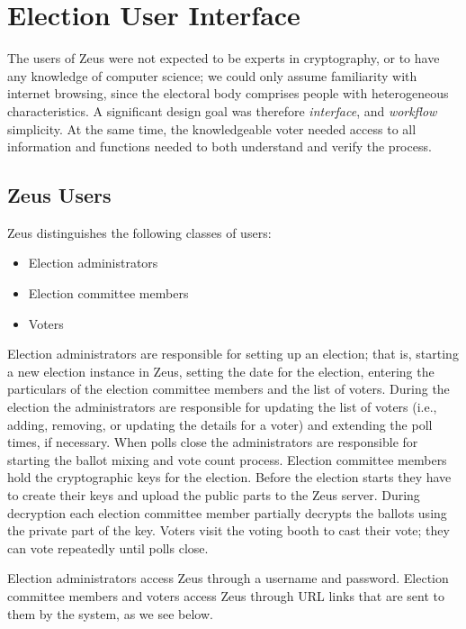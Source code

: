 \documentclass[letterpaper,twocolumn,10pt]{article}
\begin{document}
\section{Election User Interface}

The users of Zeus were not expected to be experts in cryptography, or
to have any knowledge of computer science; we could only assume
familiarity with internet browsing, since the electoral body comprises
people with heterogeneous characteristics. A significant design goal
was therefore \emph{interface}, and \emph{workflow} simplicity. At the
same time, the knowledgeable voter needed access to all information
and functions needed to both understand and verify the process.

\subsection{Zeus Users}

Zeus distinguishes the following classes of users:

\begin{itemize}
\item Election administrators
\item Election committee members
\item Voters
\end{itemize}

Election administrators are responsible for setting up an election;
that is, starting a new election instance in Zeus, setting the date
for the election, entering the particulars of the election committee
members and the list of voters. During the election the administrators
are responsible for updating the list of voters (i.e., adding,
removing, or updating the details for a voter) and extending the poll
times, if necessary. When polls close the administrators are
responsible for starting the ballot mixing and vote count process.
Election committee members hold the cryptographic keys for the
election. Before the election starts they have to create their keys
and upload the public parts to the Zeus server. During decryption each
election committee member partially decrypts the ballots using the
private part of the key. Voters visit the voting booth to cast their
vote; they can vote repeatedly until polls close.

Election administrators access Zeus through a username and password.
Election committee members and voters access Zeus through URL links
that are sent to them by the system, as we see below.
\end{document}
